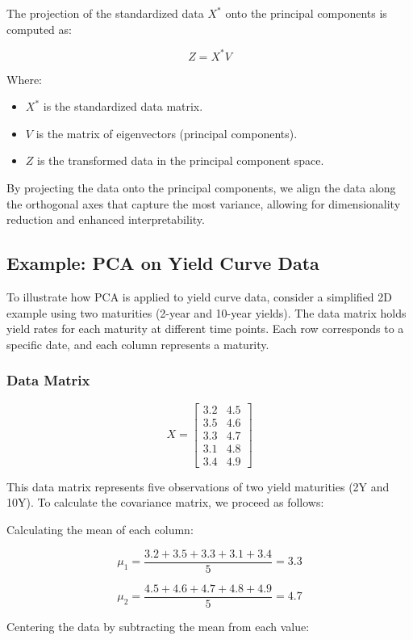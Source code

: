 \documentclass[12pt]{article}
\begin{document}
The projection of the standardized data \(X^*\) onto the principal components is computed as:

\[
Z = X^* V
\]

Where:
\begin{itemize}
    \item \(X^*\) is the standardized data matrix.
    \item \(V\) is the matrix of eigenvectors (principal components).
    \item \(Z\) is the transformed data in the principal component space.
\end{itemize}

By projecting the data onto the principal components, we align the data along the orthogonal axes that capture the most variance, allowing for dimensionality reduction and enhanced interpretability.


\subsection{Example: PCA on Yield Curve Data}

To illustrate how PCA is applied to yield curve data, consider a simplified 2D example using two maturities (2-year and 10-year yields). The data matrix holds yield rates for each maturity at different time points. Each row corresponds to a specific date, and each column represents a maturity.

\subsubsection{Data Matrix}

\[
X = \begin{bmatrix} 
3.2 & 4.5 \\
3.5 & 4.6 \\
3.3 & 4.7 \\
3.1 & 4.8 \\
3.4 & 4.9 
\end{bmatrix}
\]

This data matrix represents five observations of two yield maturities (2Y and 10Y). To calculate the covariance matrix, we proceed as follows:

Calculating the mean of each column:

\[
\mu_1 = \frac{3.2 + 3.5 + 3.3 + 3.1 + 3.4}{5} = 3.3
\]

\[
\mu_2 = \frac{4.5 + 4.6 + 4.7 + 4.8 + 4.9}{5} = 4.7
\]

Centering the data by subtracting the mean from each value:
\end{document}
